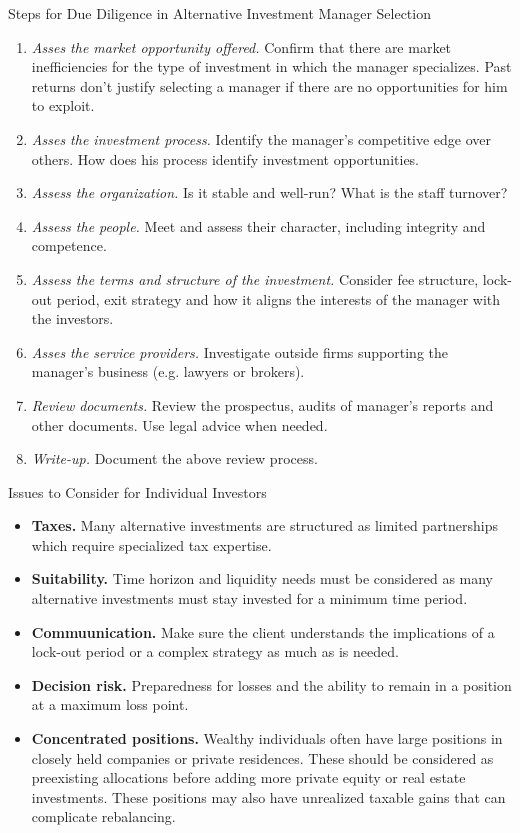 \documentclass[../custom]{flashcards}
\begin{document}
\begin{flashcard}{Steps for Due Diligence in Alternative Investment Manager Selection}
    \begin{enumerate}
        \item \textit{Asses the market opportunity offered.} Confirm that there are market inefficiencies for the type of investment in which the manager specializes. Past returns don't justify selecting a manager if there are no opportunities for him to exploit.
        \item \textit{Asses the investment process.} Identify the manager's competitive edge over others. How does his process identify investment opportunities.
        \item \textit{Assess the organization.} Is it stable and well-run? What is the staff turnover?
        \item \textit{Assess the people.} Meet and assess their character, including integrity and competence.
        \item \textit{Assess the terms and structure of the investment.} Consider fee structure, lock-out period, exit strategy and how it aligns the interests of the manager with the investors.
        \item \textit{Asses the service providers.} Investigate outside firms supporting the manager's business (e.g. lawyers or brokers).
        \item \textit{Review documents.} Review the prospectus, audits of manager's reports and other documents. Use legal advice when needed.
        \item \textit{Write-up.} Document the above review process.
    \end{enumerate}
\end{flashcard}

\begin{flashcard}{Issues to Consider for Individual Investors}
    \begin{itemize}
        \item \textbf{Taxes.} Many alternative investments are structured as limited partnerships which require specialized tax expertise.
        \item \textbf{Suitability.} Time horizon and liquidity needs must be considered as many alternative investments must stay invested for a minimum time period.
        \item \textbf{Commuunication.} Make sure the client understands the implications of a lock-out period or a complex strategy as much as is needed.
        \item \textbf{Decision risk.} Preparedness for losses and the ability to remain in a position at a maximum loss point.
        \item \textbf{Concentrated positions.} Wealthy individuals often have large positions in closely held companies or private residences. These should be considered as preexisting allocations before adding more private equity or real estate investments. These positions may also have unrealized taxable gains that can complicate rebalancing.
    \end{itemize}
\end{flashcard}
\end{document}

